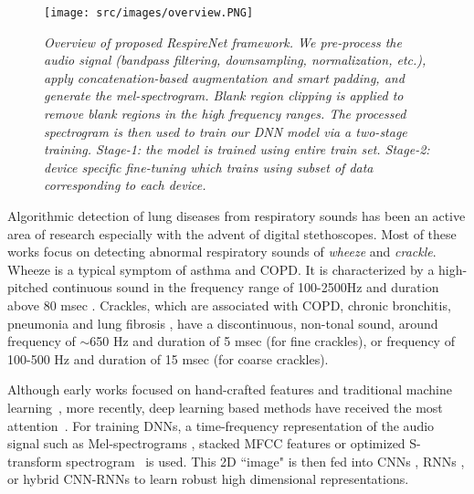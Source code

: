 \documentclass{article}
\newcommand{\method}{\textit{RespireNet}}
\begin{document}
\begin{figure}[t]
\begin{center}
    \centering
    \texttt{[image: src/images/overview.PNG]}
\end{center}
\vspace{-5mm}
    \caption{\textit{Overview of proposed \method{} framework. We pre-process the audio signal (bandpass filtering, downsampling, normalization, etc.), apply concatenation-based augmentation and smart padding, and generate the mel-spectrogram. Blank region clipping is applied to remove blank regions in the high frequency ranges. The processed spectrogram is then used to train our DNN model via a two-stage training. Stage-1: the model is trained using entire train set. Stage-2: device specific fine-tuning which trains using subset of data corresponding to each device.}} 
    \label{fig:framework}
\vspace{-5mm}
\end{figure}

Algorithmic detection of lung diseases from respiratory sounds has been an active area of research \citep{polat_04, reichert_08}
especially with the advent of digital stethoscopes. Most of these works focus on detecting abnormal respiratory sounds of \textit{wheeze} and \textit{crackle}. Wheeze is a typical symptom of asthma and COPD. It is characterized by a high-pitched continuous sound in the frequency range of 100-2500Hz and duration above 80 msec \citep{lungausc_14, analysis_08}. Crackles, which are associated with COPD, chronic bronchitis, pneumonia and lung fibrosis \citep{analysis_11, automaticar_17}, have a discontinuous, non-tonal sound, around frequency of $\sim$650 Hz and duration of 5 msec (for fine crackles), or frequency of 100-500 Hz and duration of 15 msec (for coarse crackles).

Although early works focused on hand-crafted features and traditional machine learning~\cite{jako_18, chambres_18}, more recently, deep learning based methods have received the most attention~\cite{noise_rnn_koch_18,acharya_20, lungrn_20}.
For training DNNs, a time-frequency representation of the audio signal such as Mel-spectrograms \cite{shi_vggish_19, liu_detection_19, acharya_20}, stacked MFCC features \cite{shi_vggish_19, murat_17, perna_cnn_18, messner_18, noise_rnn_koch_18} or optimized S-transform spectrogram~\cite{triple_class_chen_19} is used. This 2D ``image" is then fed into CNNs \cite{perna_cnn_18, murat_17}, RNNs \cite{deepap_perna_19, noise_rnn_koch_18}, or hybrid CNN-RNNs \cite{acharya_20} to learn robust high dimensional representations.
\end{document}
